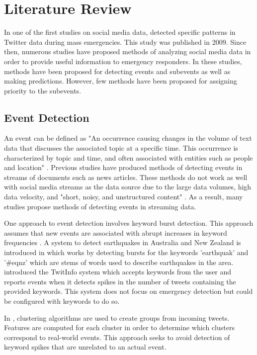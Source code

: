 \documentclass[conference]{IEEEtran}
\begin{document}
\section{Literature Review}
In one of the first studies on social media data, \cite{hughes2009twitter} detected specific patterns in Twitter data during mass emergencies. This study was published in 2009. Since then, numerous studies have proposed methods of analyzing social media data in order to provide useful information to emergency responders. In these studies, methods have been proposed for detecting events and subevents as well as making predictions. However, few methods have been proposed for assigning priority to the subevents.
\subsection{Event Detection}
An event can be defined as "An occurrence causing changes in the volume of text data that discusses the associated topic at a specific time. This occurrence is characterized by topic and time, and often associated with entities such as people and location" \cite{dou}. Previous studies have produced methods of detecting events in streams of documents such as news articles. These methods do not work as well with social media streams as the data source due to the large data volumes, high data velocity, and "short, noisy, and unstructured content" \cite{Imran}. As a result, many studies propose methods of detecting events in streaming data.

One approach to event detection involves keyword burst detection. This approach assumes that new events are associated with abrupt increases in keyword frequencies \cite{Imran}. A system to detect earthquakes in Australia and New Zealand  is introduced in \cite{robinson} which works by detecting bursts for the keywords 'earthquak' and '\#eqnz' which are stems of words used to describe earthquakes in the area. \cite{marcus2011twitinfo} introduced the TwitInfo system which accepts keywords from the user and reports events when it detects spikes in the number of tweets containing the provided keywords. This system does not focus on emergency detection but could be configured with keywords to do so.

In \cite{becker2011beyond}, clustering algorithms are used to create groups from incoming tweets. Features are computed for each cluster in order to determine which clusters correspond to real-world events. This approach seeks to avoid detection of keyword spikes that are unrelated to an actual event.
\end{document}
